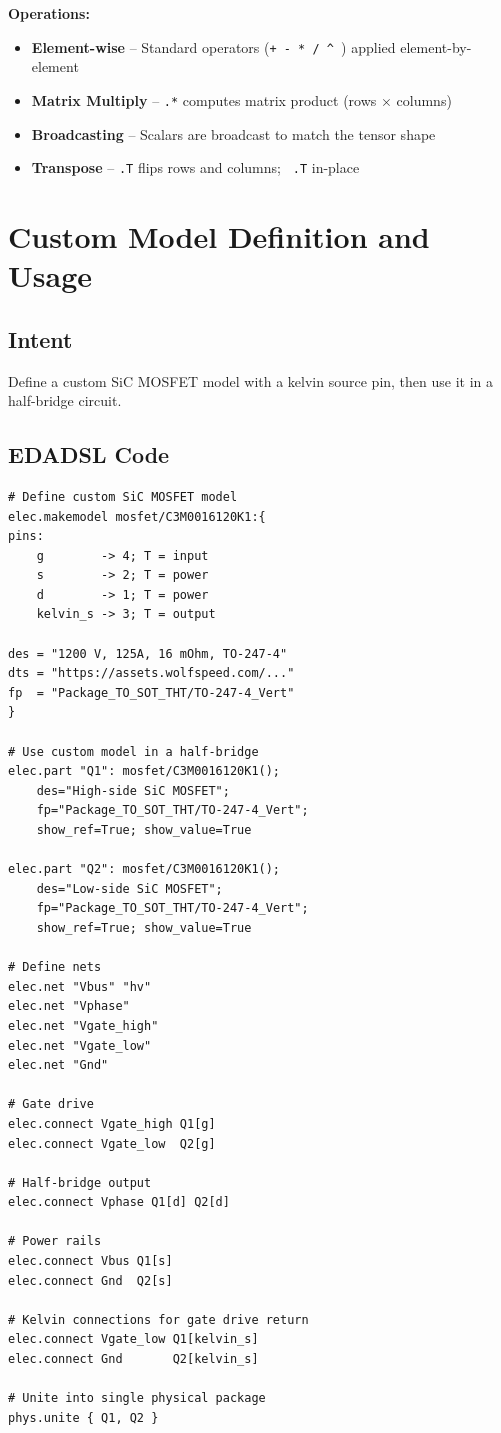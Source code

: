 \vspace{5mm}
\textbf{Operations:}
\begin{itemize}
\item \textbf{Element-wise} -- Standard operators (\texttt{+ - * / \^{} }) applied element-by-element
\item \textbf{Matrix Multiply} -- \texttt{.*} computes matrix product (rows $\times$ columns)
\item \textbf{Broadcasting} -- Scalars are broadcast to match the tensor shape
\item \textbf{Transpose} -- \texttt{.T} flips rows and columns; \texttt{~.T} in-place
\end{itemize}

\section{Custom Model Definition and Usage}
\subsection{Intent}
Define a custom SiC MOSFET model with a kelvin source pin, then use it in a half-bridge circuit.

\subsection{EDADSL Code}
\begin{verbatim}
# Define custom SiC MOSFET model
elec.makemodel mosfet/C3M0016120K1:{
pins:
    g        -> 4; T = input
    s        -> 2; T = power
    d        -> 1; T = power
    kelvin_s -> 3; T = output

des = "1200 V, 125A, 16 mOhm, TO-247-4"
dts = "https://assets.wolfspeed.com/..."
fp  = "Package_TO_SOT_THT/TO-247-4_Vert"
}

# Use custom model in a half-bridge
elec.part "Q1": mosfet/C3M0016120K1();
    des="High-side SiC MOSFET";
    fp="Package_TO_SOT_THT/TO-247-4_Vert";
    show_ref=True; show_value=True

elec.part "Q2": mosfet/C3M0016120K1();
    des="Low-side SiC MOSFET";
    fp="Package_TO_SOT_THT/TO-247-4_Vert";
    show_ref=True; show_value=True

# Define nets
elec.net "Vbus" "hv"
elec.net "Vphase"
elec.net "Vgate_high"
elec.net "Vgate_low"
elec.net "Gnd"

# Gate drive
elec.connect Vgate_high Q1[g]
elec.connect Vgate_low  Q2[g]

# Half-bridge output
elec.connect Vphase Q1[d] Q2[d]

# Power rails
elec.connect Vbus Q1[s]
elec.connect Gnd  Q2[s]

# Kelvin connections for gate drive return
elec.connect Vgate_low Q1[kelvin_s]
elec.connect Gnd       Q2[kelvin_s]

# Unite into single physical package
phys.unite { Q1, Q2 }
\end{verbatim}

